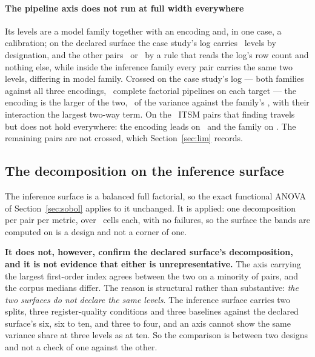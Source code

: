 \paragraph{The pipeline axis does not run at full width everywhere}
Its levels are a model family together with an encoding and, in one case, a
calibration; on the declared surface the case study's log carries
\nPipelineLevelsCase\ levels by designation, and the other pairs
\nPipelineLevelsLarge\ or \nPipelineLevelsModal\ by a rule that reads the
log's row count and nothing else, while inside the inference family every
pair carries the same two levels, differing in model family. Crossed on the
case study's log --- both families against all three encodings,
\nCrossedPipelines\ complete factorial pipelines on each target --- the
encoding is the larger of the two, \sEncodingPct\ of the variance against the
family's \sFamilyPct, with their interaction the largest two-way term. On the
\nItsmCrossed\ ITSM pairs that finding travels but does not hold everywhere:
the encoding leads on \nEncodingLargerItsm\ and the family on
\nFamilyLargerItsm. The remaining pairs are not crossed, which
Section~\ref{sec:lim} records.

\subsection{The decomposition on the inference surface}
\label{app:infanova}

The inference surface is a balanced full factorial, so the exact functional
ANOVA of Section~\ref{sec:sobol} applies to it unchanged. It is applied: one
decomposition per pair per metric, over \nCellsPerDecomposition\ cells each,
with no failures, so the surface the bands are computed on is a design and
not a corner of one.

\textbf{It does not, however, confirm the declared surface's decomposition,
and it is not evidence that either is unrepresentative.} The axis carrying the
largest first-order index agrees between the two on a minority of pairs, and
the corpus medians differ. The reason is structural rather than substantive:
\emph{the two surfaces do not declare the same levels}. The inference surface
carries two splits, three register-quality conditions and three baselines against
the declared surface's six, six to ten, and three to four, and an axis cannot
show the same variance share at three levels as at ten. So the comparison is
between two designs and not a check of one against the other.

